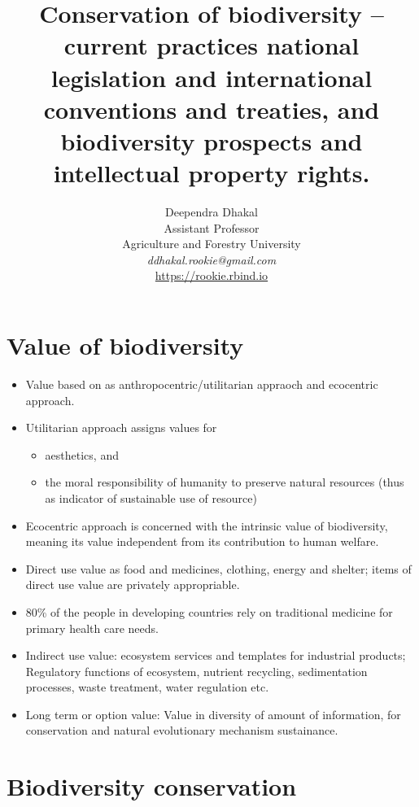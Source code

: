 \documentclass[
  ignorenonframetext,
  aspectratio=169]{beamer}
\title{Conservation of biodiversity -- current practices national
legislation and international conventions and treaties, and biodiversity
prospects and intellectual property rights.}
\author{Deependra Dhakal\\
Assistant Professor\\
Agriculture and Forestry University\\
\textit{ddhakal.rookie@gmail.com}\\
\url{https://rookie.rbind.io}}
\date{}
\providecommand{\tightlist}{%
  \setlength{\itemsep}{0pt}\setlength{\parskip}{0pt}}
\begin{document}
\frame{\titlepage}

\begin{frame}[allowframebreaks]
  \tableofcontents[hideallsubsections]
\end{frame}
\hypertarget{value-of-biodiversity}{%
\section{Value of biodiversity}\label{value-of-biodiversity}}

\begin{frame}{}
\protect\hypertarget{section}{}
\begin{itemize}
\tightlist
\item
  Value based on as anthropocentric/utilitarian appraoch and ecocentric
  approach.
\item
  Utilitarian approach assigns values for

  \begin{itemize}
  \tightlist
  \item
    aesthetics, and
  \item
    the moral responsibility of humanity to preserve natural resources
    (thus as indicator of sustainable use of resource)
  \end{itemize}
\item
  Ecocentric approach is concerned with the intrinsic value of
  biodiversity, meaning its value independent from its contribution to
  human welfare.
\item
  Direct use value as food and medicines, clothing, energy and shelter;
  items of direct use value are privately appropriable.
\item
  80\% of the people in developing countries rely on traditional
  medicine for primary health care needs.
\item
  Indirect use value: ecosystem services and templates for industrial
  products; Regulatory functions of ecosystem, nutrient recycling,
  sedimentation processes, waste treatment, water regulation etc.
\item
  Long term or option value: Value in diversity of amount of
  information, for conservation and natural evolutionary mechanism
  sustainance.
\end{itemize}
\end{frame}

\hypertarget{biodiversity-conservation}{%
\section{Biodiversity conservation}\label{biodiversity-conservation}}
\end{document}
